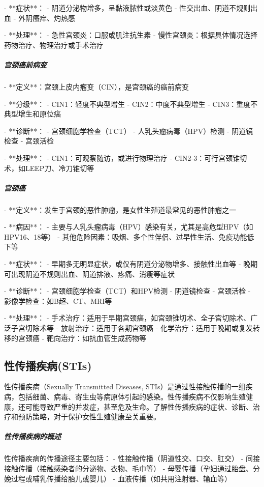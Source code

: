 \begin{enumerate}
- **症状**：
  - 阴道分泌物增多，呈黏液脓性或淡黄色
  - 性交出血、阴道不规则出血
  - 外阴瘙痒、灼热感

- **处理**：
  - 急性宫颈炎：口服或肌注抗生素
  - 慢性宫颈炎：根据具体情况选择药物治疗、物理治疗或手术治疗

\subparagraph{宫颈癌前病变}

- **定义**：宫颈上皮内瘤变（CIN），是宫颈癌的癌前病变

- **分级**：
  - CIN1：轻度不典型增生
  - CIN2：中度不典型增生
  - CIN3：重度不典型增生和原位癌

- **诊断**：
  - 宫颈细胞学检查（TCT）
  - 人乳头瘤病毒（HPV）检测
  - 阴道镜检查
  - 宫颈活检

- **处理**：
  - CIN1：可观察随访，或进行物理治疗
  - CIN2-3：可行宫颈锥切术，如LEEP刀、冷刀锥切等

\subparagraph{宫颈癌}

- **定义**：发生于宫颈的恶性肿瘤，是女性生殖道最常见的恶性肿瘤之一

- **病因**：
  - 主要与人乳头瘤病毒（HPV）感染有关，尤其是高危型HPV（如HPV16、18等）
  - 其他危险因素：吸烟、多个性伴侣、过早性生活、免疫功能低下等

- **症状**：
  - 早期多无明显症状，或仅有阴道分泌物增多、接触性出血等
  - 晚期可出现阴道不规则出血、阴道排液、疼痛、消瘦等症状

- **诊断**：
  - 宫颈细胞学检查（TCT）和HPV检测
  - 阴道镜检查
  - 宫颈活检
  - 影像学检查：如B超、CT、MRI等

- **处理**：
  - 手术治疗：适用于早期宫颈癌，如宫颈锥切术、全子宫切除术、广泛子宫切除术等
  - 放射治疗：适用于各期宫颈癌
  - 化学治疗：适用于晚期或复发转移的宫颈癌
  - 靶向治疗：如抗血管生成药物等

\subsection{性传播疾病(STIs)}

性传播疾病（Sexually Transmitted Diseases, STIs）是通过性接触传播的一组疾病，包括细菌、病毒、寄生虫等病原体引起的感染。性传播疾病不仅影响生殖健康，还可能导致严重的并发症，甚至危及生命。了解性传播疾病的症状、诊断、治疗和预防策略，对于保护女性生殖健康至关重要。

\subparagraph{性传播疾病的概述}

性传播疾病的传播途径主要包括：
- 性接触传播（阴道性交、口交、肛交）
- 间接接触传播（接触感染者的分泌物、衣物、毛巾等）
- 母婴传播（孕妇通过胎盘、分娩过程或哺乳传播给胎儿或婴儿）
- 血液传播（如共用注射器、输血等）


\end{enumerate}
